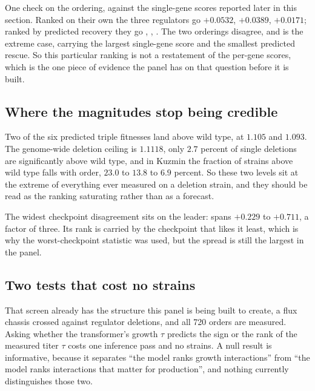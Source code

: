 One check on the ordering, against the single-gene scores reported later in this
section. Ranked on their own the three regulators go  $+0.0532$,
 $+0.0389$,  $+0.0171$; ranked by predicted recovery they go
, , . The two orderings disagree, and 
is the extreme case, carrying the largest single-gene score and the smallest
predicted rescue. So this particular ranking is not a restatement of the per-gene
scores, which is the one piece of evidence the panel has on that question before
it is built.

\subsection{Where the magnitudes stop being credible}

Two of the six predicted triple fitnesses land above wild type, at $1.105$ and
$1.093$. The genome-wide deletion ceiling is $1.1118$, only $2.7$ percent of
single deletions are significantly above wild type, and in Kuzmin the fraction of
strains above wild type falls with order, $23.0$ to $13.8$ to $6.9$ percent. So
these two levels sit at the extreme of everything ever measured on a deletion
strain, and they should be read as the ranking saturating rather than as a
forecast.

The widest checkpoint disagreement sits on the leader:  
 spans $+0.229$ to $+0.711$, a factor of three. Its rank is carried by
the checkpoint that likes it least, which is why the worst-checkpoint statistic
was used, but the spread is still the largest in the panel.

\subsection{Two tests that cost no strains}

 That screen already
has the structure this panel is being built to create, a flux chassis crossed
against regulator deletions, and all 720 orders are measured. Asking whether the
transformer's growth $\tau$ predicts the sign or the rank of the measured titer
$\tau$ costs one inference pass and no strains. A null result is informative,
because it separates ``the model ranks growth interactions'' from ``the model
ranks interactions that matter for production'', and nothing currently
distinguishes those two.


